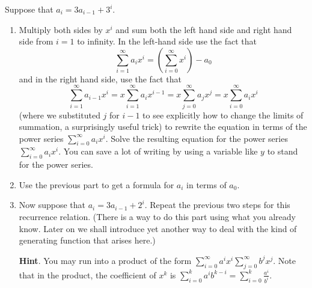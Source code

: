 \documentclass{book}
\begin{document}
\setcounter{cpjt}{258}
\addtocounter{cpjt}{-1}
\begin{activity}\label{substituteandsolve}
\hypertarget{p-1334}{}%
Suppose that \(a_i=3a_{i-1} + 3^i\).%
\begin{enumerate}[font=\bfseries,label=(\alph*),ref=\alph*]
\item\label{task-244} \hypertarget{p-1335}{}%
Multiply both sides by \(x^i\) and sum both the left hand side and right hand side from \(i=1\) to infinity.  In the left-hand side use the fact that%
\begin{equation*}
\sum_{i=1}^\infty a_ix^i = (\sum_{i=0}^\infty x^i) -a_0
\end{equation*}
and in the right hand side, use the fact that%
\begin{equation*}
\sum_{i=1}^\infty a_{i-1}x^i = x\sum_{i=1}^\infty a_ix^{i-1}
=x\sum_{j=0}^\infty a_jx^j =x\sum_{i=0}^\infty a_ix^i
\end{equation*}
(where we substituted \(j\) for \(i-1\) to see explicitly how to change the limits of summation, a surprisingly useful trick) to rewrite the equation in terms of the power series \(\sum_{i=0}^\infty a_ix^i\).  Solve the resulting equation for the power series \(\sum_{i=0}^\infty a_ix^i\). You can save a lot of writing by using a variable like \(y\) to stand for the power series.%
\par\smallskip%
\noindent\item\label{task-245} \hypertarget{p-1337}{}%
Use the previous part to get a formula for \(a_i\) in terms of \(a_0\).%
\par\smallskip%
\noindent\item\label{task-246} \hypertarget{p-1339}{}%
Now suppose that \(a_i=3a_{i-1} + 2^i\).  Repeat the previous two steps for this recurrence relation.  (There is a way to do this part using what you already know.  Later on we shall introduce yet another way to deal with the kind of generating function that arises here.)%
\par\smallskip%
\noindent\textbf{Hint}.\hypertarget{hint-167}{}\quad%
\hypertarget{p-1340}{}%
You may run into a product of the form \(\sum_{i=0}^\infty a^ix^i\sum_{j=0}^\infty b^jx^j\). Note that in the product, the coefficient of \(x^k\) is \(\sum_{i=0}^k a^ib^{k-i} = \sum_{i=0}^k \frac{a^i}{b^i}\).%
\par\smallskip%
\noindent\end{enumerate}
\end{activity}

\clearpage
\end{document}
